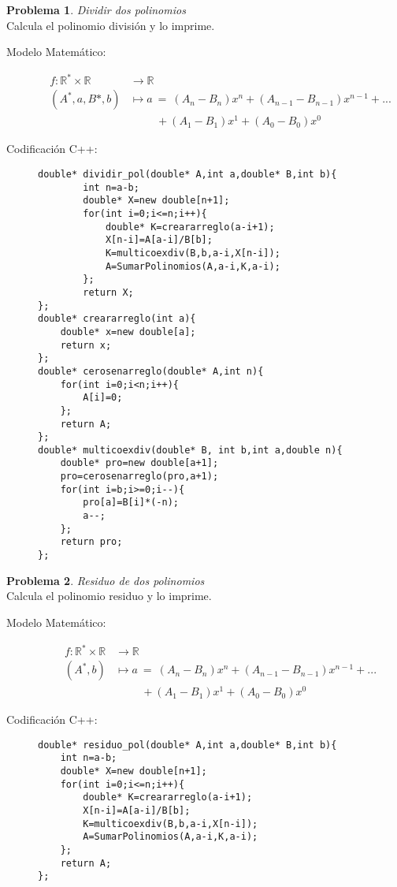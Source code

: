 \documentclass{article}
\theoremstyle{plain}
\theoremstyle{definition}
\newtheorem{problem}{Problema}
\begin{document}
\begin{problem} \emph{Dividir dos polinomios}\\
Calcula el polinomio división y lo imprime.
%
\begin{description}
\item[Modelo Matemático:]
%
\begin{align*}
f: \mathbb{R}^*\times\mathbb{R}&\to \mathbb{R}\\
(A^*,a,B*,b) &\mapsto a\ =\ (A_n-B_n) x^n + (A_{n-1}-B_{n-1}) x^{n-1} + ... \\& \hspace{1cm}+ (A_1-B_1) x^1 + (A_0-B_0) x^0
\end{align*}
%
\item[Codificación \textsf{C++}:]\hfill
%
\begin{verbatim}
double* dividir_pol(double* A,int a,double* B,int b){
        int n=a-b;
        double* X=new double[n+1];
        for(int i=0;i<=n;i++){
            double* K=creararreglo(a-i+1);
            X[n-i]=A[a-i]/B[b];
            K=multicoexdiv(B,b,a-i,X[n-i]);
            A=SumarPolinomios(A,a-i,K,a-i);
        };
        return X;
};
double* creararreglo(int a){
    double* x=new double[a];
    return x;
};
double* cerosenarreglo(double* A,int n){
    for(int i=0;i<n;i++){
        A[i]=0;
    };
    return A;
};
double* multicoexdiv(double* B, int b,int a,double n){
    double* pro=new double[a+1];
    pro=cerosenarreglo(pro,a+1);
    for(int i=b;i>=0;i--){
        pro[a]=B[i]*(-n);
        a--;
    };
    return pro;
};
\end{verbatim}
\end{description}
\end{problem}
\begin{problem} \emph{Residuo de dos polinomios}\\
Calcula el polinomio residuo y lo imprime.
%
\begin{description}
\item[Modelo Matemático:]
%
\begin{align*}
f: \mathbb{R}^*\times\mathbb{R}&\to \mathbb{R}\\
(A^*,b) &\mapsto a\ =\ (A_n-B_n) x^n + (A_{n-1}-B_{n-1}) x^{n-1} + ... \\& \hspace{1cm}+ (A_1-B_1) x^1 + (A_0-B_0) x^0
\end{align*}
%
\item[Codificación \textsf{C++}:]\hfill
%
\begin{verbatim}
double* residuo_pol(double* A,int a,double* B,int b){
    int n=a-b;
    double* X=new double[n+1];
    for(int i=0;i<=n;i++){
        double* K=creararreglo(a-i+1);
        X[n-i]=A[a-i]/B[b];
        K=multicoexdiv(B,b,a-i,X[n-i]);
        A=SumarPolinomios(A,a-i,K,a-i);
    };
    return A;
};
\end{verbatim}
\end{description}
\end{problem}
\end{document}

